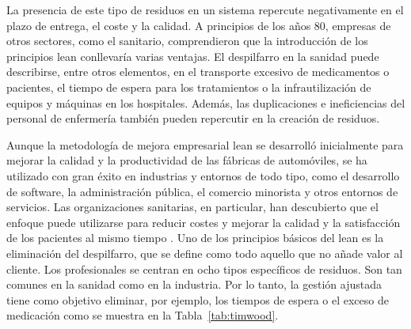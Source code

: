 La presencia de este tipo de residuos en un sistema repercute negativamente en el plazo de entrega, el coste y la calidad.
A principios de los años 80, empresas de otros sectores, como el sanitario, comprendieron que la introducción de los principios lean conllevaría varias ventajas.
El despilfarro en la sanidad puede describirse, entre otros elementos, en el transporte excesivo de medicamentos o pacientes, el tiempo de espera para los tratamientos o la infrautilización de equipos y máquinas en los hospitales. Además, las duplicaciones e ineficiencias del personal de enfermería también pueden repercutir en la creación de residuos.

Aunque la metodología de mejora empresarial lean se desarrolló inicialmente para mejorar la calidad y la productividad de las fábricas de automóviles, se ha utilizado con gran éxito en industrias y entornos de todo tipo, como el desarrollo de software, la administración pública, el comercio minorista y otros entornos de servicios.
Las organizaciones sanitarias, en particular, han descubierto que el enfoque puede utilizarse para reducir costes y mejorar la calidad y la satisfacción de los pacientes al mismo tiempo \cite{millard_how_nodate}.
Uno de los principios básicos del lean es la eliminación del despilfarro, que se define como todo aquello que no añade valor al cliente.
Los profesionales se centran en ocho tipos específicos de residuos.
Son tan comunes en la sanidad como en la industria.
Por lo tanto, la gestión ajustada tiene como objetivo eliminar, por ejemplo, los tiempos de espera o el exceso de medicación como se muestra en la Tabla~\ref{tab:timwood}.


